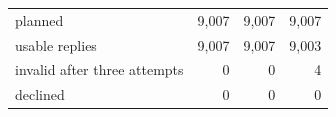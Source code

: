 \begin{tabular}{p{6.6cm}rrr}
planned & 9,007 & 9,007 & 9,007 \\
usable replies & 9,007 & 9,007 & 9,003 \\
invalid after three attempts & 0 & 0 & 4 \\
declined & 0 & 0 & 0 \\
\bottomrule
\end{tabular}
